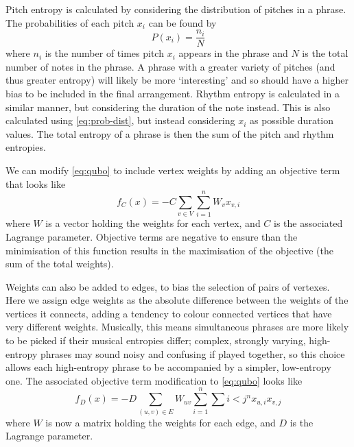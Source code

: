 \documentclass[12pt]{article}
\theoremstyle{definition}
\begin{document}
Pitch entropy is calculated by considering the distribution of pitches in a phrase. The probabilities of each pitch $x_i$ can be found by
\begin{equation}
    P(x_i)=\frac{n_i}{N}
    \label{eq:prob-dist}
\end{equation}
where $n_i$ is the number of times pitch $x_i$ appears in the phrase and $N$ is the total number of notes in the phrase. A phrase with a greater variety of pitches (and thus greater entropy) will likely be more `interesting' and so should have a higher bias to be included in the final arrangement.
Rhythm entropy is calculated in a similar manner, but considering the duration of the note instead. This is also calculated using \cref{eq:prob-dist}, but instead considering $x_i$ as possible duration values.
The total entropy of a phrase is then the sum of the pitch and rhythm entropies.

We can modify \cref{eq:qubo} to include vertex weights by adding an objective term that looks like
\begin{equation}
    f_C(x)=-C\sum_{v\in V}\sum_{i=1}^n W_v x_{v,i}
\end{equation}
where $W$ is a vector holding the weights for each vertex, and $C$ is the associated Lagrange parameter. Objective terms are negative to ensure than the minimisation of this function results in the maximisation of the objective (the sum of the total weights).

Weights can also be added to edges, to bias the selection of pairs of vertexes. Here we assign edge weights as the absolute difference between the weights of the vertices it connects, adding a tendency to colour connected vertices that have very different weights. Musically, this means simultaneous phrases are more likely to be picked if their musical entropies differ; complex, strongly varying, high-entropy phrases may sound noisy and confusing if played together, so this choice allows each high-entropy phrase to be accompanied by a simpler, low-entropy one. The associated objective term modification to \cref{eq:qubo} looks like
\begin{equation}
    f_D(x)=-D\sum_{(u,v)\in E}W_{uv}\sum_{i=1}^n\sum{i<j}^n x_{u,i}x_{v,j}
\end{equation}
where $W$ is now a matrix holding the weights for each edge, and $D$ is the Lagrange parameter.
\end{document}
